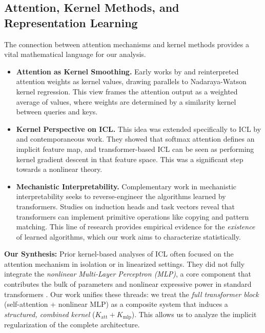 \subsection{Attention, Kernel Methods, and Representation Learning}
\label{subsec:attention-kernel}

The connection between attention mechanisms and kernel methods provides a vital mathematical language for our analysis.

\begin{itemize}
	\item \textbf{Attention as Kernel Smoothing.} Early works by \citet{tsai2019transformer} and \citet{katharopoulos2020transformers} reinterpreted attention weights as kernel values, drawing parallels to Nadaraya-Watson kernel regression. This view frames the attention output as a weighted average of values, where weights are determined by a similarity kernel between queries and keys.
	\item \textbf{Kernel Perspective on ICL.} This idea was extended specifically to ICL by \citet{chen2024kernels} and contemporaneous work. They showed that softmax attention defines an implicit feature map, and transformer-based ICL can be seen as performing kernel gradient descent in that feature space. This was a significant step towards a nonlinear theory.
	\item \textbf{Mechanistic Interpretability.} Complementary work in mechanistic interpretability seeks to reverse-engineer the algorithms learned by transformers. Studies on induction heads \citep{elhage2021mathematical} and task vectors \citep{ilharco2022patching} reveal that transformers can implement primitive operations like copying and pattern matching. This line of research provides empirical evidence for the \textit{existence} of learned algorithms, which our work aims to characterize statistically.
\end{itemize}

\textbf{Our Synthesis:} Prior kernel-based analyses of ICL often focused on the attention mechanism in isolation or in linearized settings. They did not fully integrate the \textit{nonlinear Multi-Layer Perceptron (MLP)}, a core component that contributes the bulk of parameters and nonlinear expressive power in standard transformers \citep{sohn2024understanding}. Our work unifies these threads: we treat the \textit{full transformer block} (self-attention + nonlinear MLP) as a composite system that induces a \textit{structured, combined kernel} ($K_{\text{att}} + K_{\text{mlp}}$). This allows us to analyze the implicit regularization of the complete architecture.

